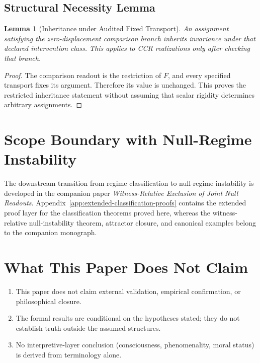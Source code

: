 \documentclass[11pt,a4paper]{article}
\theoremstyle{plain}
\newtheorem{lemma}[theorem]{Lemma}
\theoremstyle{definition}
\theoremstyle{remark}
\begin{document}
\subsection{Structural Necessity Lemma}

\begin{lemma}[Inheritance under Audited Fixed Transport]
An assignment satisfying the zero-displacement comparison branch inherits invariance under that declared intervention class. This applies to CCR realizations only after checking that branch.
\end{lemma}

\begin{proof}
The comparison readout is the restriction of $F$, and every specified transport fixes its argument. Therefore its value is unchanged. This proves the restricted inheritance statement without assuming that scalar rigidity determines arbitrary assignments.
\end{proof}

\section{Scope Boundary with Null-Regime Instability}

The downstream transition from regime classification to null-regime instability is developed in the companion paper \textit{Witness-Relative Exclusion of Joint Null Readouts}. Appendix~\ref{app:extended-classification-proofs} contains the extended proof layer for the classification theorems proved here, whereas the witness-relative null-instability theorem, attractor closure, and canonical examples belong to the companion monograph.

\section*{What This Paper Does Not Claim}
\begin{enumerate}
\item This paper does not claim external validation, empirical confirmation, or philosophical closure.
\item The formal results are conditional on the hypotheses stated; they do not establish truth outside the assumed structures.
\item No interpretive-layer conclusion (consciousness, phenomenality, moral status) is derived from terminology alone.
\end{enumerate}
\end{document}
